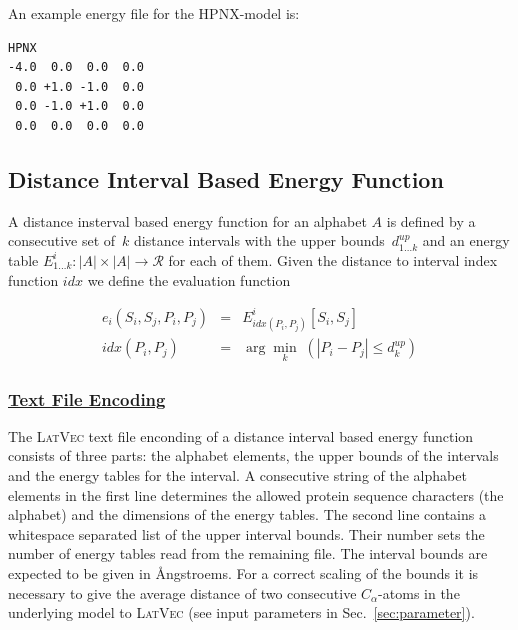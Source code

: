 \documentclass{article}
\newcommand{\latvec}{\textsc{LatVec}}
\newenvironment{boxit}{\begin{lrbox}{\savepar}\begin{minipage}[t]{0.8\textwidth}}
                      {\end{minipage}\end{lrbox}\fbox{\usebox{\savepar}}}
\begin{document}
An example energy file for the HPNX-model is:

\begin{center}
\begin{boxit}
\small
\begin{verbatim}
HPNX
-4.0  0.0  0.0  0.0
 0.0 +1.0 -1.0  0.0
 0.0 -1.0 +1.0  0.0
 0.0  0.0  0.0  0.0
\end{verbatim}
\end{boxit}
\end{center}


\subsection{Distance Interval Based Energy Function}
\label{sec:energy:distance}

A distance insterval based energy function for an alphabet $A$ is defined by a
consecutive set of~$k$ distance intervals with the upper bounds~$d^{up}_{1\ldots
k}$ and an energy table $E^i_{1\ldots k} : |A|\times|A| \rightarrow \mathcal{R}$
for each of them. Given the distance to interval index function $idx$ we define
the evaluation function

\begin{eqnarray}
	e_i(S_i, S_j, P_i, P_j) & = & E^i_{idx(P_i,P_j)}[S_i,S_j] \\
	idx(P_i,P_j) & = & \arg\min_{k}\;(|P_i-P_j| \leq d^{up}_k)
\end{eqnarray}


\subsubsection*{\underline{ Text File Encoding }}

The \latvec{} text file enconding of a distance interval based energy function
consists of three parts: the alphabet elements, the upper bounds of the intervals
and the energy tables for the interval. A consecutive string of the alphabet
elements in the first line determines the allowed protein sequence characters
(the alphabet) and the dimensions of the energy tables. The second line
contains a whitespace separated list of the upper interval bounds. Their number
sets the number of energy tables read from the remaining file. The interval
bounds are expected to be given in {\AA}ngstroems. For a correct scaling of
the bounds it is necessary to give the average distance of two consecutive
$C_\alpha$-atoms in the underlying model to \latvec{} (see input parameters in
Sec.~\ref{sec:parameter}).
\end{document}
